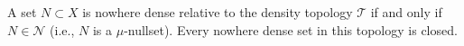 A set $N \subset X$ is nowhere dense relative to the density topology $\mathcal{T}$ if and only if $N \in \mathcal{N}$ (i.e., $N$ is a $\mu$-nullset). Every nowhere dense set in this topology is closed.
